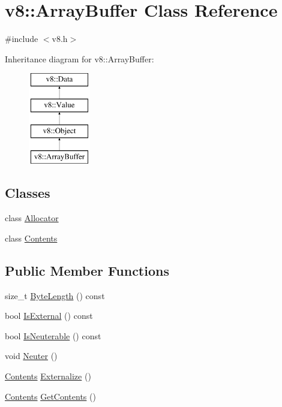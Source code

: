 \hypertarget{classv8_1_1ArrayBuffer}{}\section{v8\+:\+:Array\+Buffer Class Reference}
\label{classv8_1_1ArrayBuffer}


{\ttfamily \#include $<$v8.\+h$>$}

Inheritance diagram for v8\+:\+:Array\+Buffer\+:\begin{figure}[H]
\begin{center}
\leavevmode
\includegraphics[height=4.000000cm]{classv8_1_1ArrayBuffer}
\end{center}
\end{figure}
\subsection*{Classes}
\begin{DoxyCompactItemize}
\item 
class \mbox{\hyperlink{classv8_1_1ArrayBuffer_1_1Allocator}{Allocator}}
\item 
class \mbox{\hyperlink{classv8_1_1ArrayBuffer_1_1Contents}{Contents}}
\end{DoxyCompactItemize}
\subsection*{Public Member Functions}
\begin{DoxyCompactItemize}
\item 
size\+\_\+t \mbox{\hyperlink{classv8_1_1ArrayBuffer_af4c4ad8075f74892ed3fa217219a2626}{Byte\+Length}} () const
\item 
bool \mbox{\hyperlink{classv8_1_1ArrayBuffer_a22ecea76af2257b12bdb69b40d9bec8f}{Is\+External}} () const
\item 
bool \mbox{\hyperlink{classv8_1_1ArrayBuffer_a5de3f4c29744bd89204462f987ecb626}{Is\+Neuterable}} () const
\item 
void \mbox{\hyperlink{classv8_1_1ArrayBuffer_a3420f7d38a8fe20e8f40fb82e6acb325}{Neuter}} ()
\item 
\mbox{\hyperlink{classv8_1_1ArrayBuffer_1_1Contents}{Contents}} \mbox{\hyperlink{classv8_1_1ArrayBuffer_a8b90b72486cfacb4fbec157f4803f889}{Externalize}} ()
\item 
\mbox{\hyperlink{classv8_1_1ArrayBuffer_1_1Contents}{Contents}} \mbox{\hyperlink{classv8_1_1ArrayBuffer_ae44291df12ca35de9b519e7372aa640a}{Get\+Contents}} ()
\end{DoxyCompactItemize}
